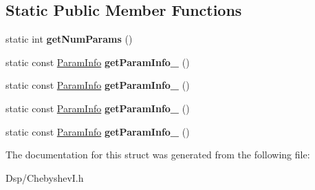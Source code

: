 \subsection*{Static Public Member Functions}
\begin{DoxyCompactItemize}
\item 
\hypertarget{structDsp_1_1ChebyshevI_1_1Design_1_1TypeIVBase_aa2955f20d624cc76587f1776af6a8457}{static int {\bfseries get\-Num\-Params} ()}\label{structDsp_1_1ChebyshevI_1_1Design_1_1TypeIVBase_aa2955f20d624cc76587f1776af6a8457}

\item 
\hypertarget{structDsp_1_1ChebyshevI_1_1Design_1_1TypeIVBase_ad35c21fb6aa454a4e5f3108bcf18ae49}{static const \hyperlink{classDsp_1_1ParamInfo}{Param\-Info} {\bfseries get\-Param\-Info\-\_} ()}\label{structDsp_1_1ChebyshevI_1_1Design_1_1TypeIVBase_ad35c21fb6aa454a4e5f3108bcf18ae49}

\item 
\hypertarget{structDsp_1_1ChebyshevI_1_1Design_1_1TypeIVBase_a9605203a78b273ffc8aca07e4b56db93}{static const \hyperlink{classDsp_1_1ParamInfo}{Param\-Info} {\bfseries get\-Param\-Info\-\_} ()}\label{structDsp_1_1ChebyshevI_1_1Design_1_1TypeIVBase_a9605203a78b273ffc8aca07e4b56db93}

\item 
\hypertarget{structDsp_1_1ChebyshevI_1_1Design_1_1TypeIVBase_a0f81fc274ae854a728c7007dbdce5ac6}{static const \hyperlink{classDsp_1_1ParamInfo}{Param\-Info} {\bfseries get\-Param\-Info\-\_} ()}\label{structDsp_1_1ChebyshevI_1_1Design_1_1TypeIVBase_a0f81fc274ae854a728c7007dbdce5ac6}

\item 
\hypertarget{structDsp_1_1ChebyshevI_1_1Design_1_1TypeIVBase_a1e19ec475b53407cc4261d9fda8f1a93}{static const \hyperlink{classDsp_1_1ParamInfo}{Param\-Info} {\bfseries get\-Param\-Info\-\_} ()}\label{structDsp_1_1ChebyshevI_1_1Design_1_1TypeIVBase_a1e19ec475b53407cc4261d9fda8f1a93}

\end{DoxyCompactItemize}


The documentation for this struct was generated from the following file\-:\begin{DoxyCompactItemize}
\item 
Dsp/Chebyshev\-I.\-h\end{DoxyCompactItemize}
